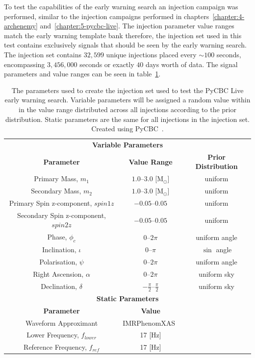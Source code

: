 To test the capabilities of the early warning search an injection campaign was performed, similar to the injection campaigns performed in chapters~\ref{chapter:4-archenemy} and~\ref{chapter:5-pycbc-live}. The injection parameter value ranges match the early warning template bank therefore, the injection set used in this test contains exclusively signals that should be seen by the early warning search. The injection set contains $32,599$ unique injections placed every ${\sim}100$ seconds, encompassing $3,456,000$ seconds or exactly $40$ days worth of data. The signal parameters and value ranges can be seen in table~\ref{6:tab:ew_inj_params}.
%
\begin{table}[ht]
    \centering
    \setlength{\tabcolsep}{4pt}
    \begin{tabular}{ccc}
        \toprule
        \multicolumn{3}{c}{\textbf{Variable Parameters}} \\
        \cmidrule(lr){1-3}
        \textbf{Parameter} & \textbf{Value Range} & \textbf{Prior Distribution} \\
        \midrule
        Primary Mass, $m_1$ & $1.0\text{--}3.0$ [$\text{M$_{\odot}$}$] & uniform \\
        Secondary Mass, $m_2$ & $1.0\text{--}3.0$ [$\text{M$_{\odot}$}$] & uniform \\
        Primary Spin z-component, $spin1z$ & $-0.05\text{--}0.05$ & uniform \\
        Secondary Spin z-component, $spin2z$ & $-0.05\text{--}0.05$ & uniform \\
        Phase, $\phi_{c}$ & $0\text{--}2\pi$ & uniform angle \\
        Inclination, $\iota$ & $0\text{--}\pi$ & $\sin$ angle \\
        Polarisation, $\psi$ & $0\text{--}2\pi$ & uniform angle \\
        Right Ascension, $\alpha$ & $0\text{--}2\pi$ & uniform sky \\
        Declination, $\delta$ & $-\frac{\pi}{2}\text{--}\frac{\pi}{2}$ & uniform sky \\
        \bottomrule
        \multicolumn{3}{c}{\textbf{Static Parameters}} \\
        \cmidrule(lr){1-3}
        \textbf{Parameter} & \textbf{Value} & \textbf{} \\
        \midrule
        Waveform Approximant & IMRPhenomXAS~\cite{IMRPhenomXAS:2020} & \\
        Lower Frequency, $f_{lower}$ & 17 [$\text{Hz}$] & \\
        Reference Frequency, $f_{ref}$ & 17 [$\text{Hz}$] & \\
        \bottomrule
    \end{tabular}
    \caption{The parameters used to create the injection set used to test the PyCBC Live early warning search. Variable parameters will be assigned a random value within in the value range distributed across all injections according to the prior distribution. Static parameters are the same for all injections in the injection set. Created using PyCBC~\cite{PyCBC_package:2021}.}
    \label{6:tab:ew_inj_params}
\end{table}
%

